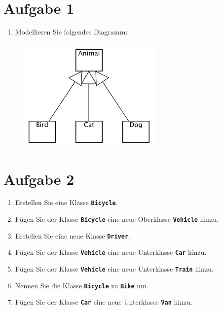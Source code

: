 \documentclass[12pt]{article}
\begin{document}
\section*{Aufgabe 1}

\begin{enumerate}
    \item Modellieren Sie folgendes Diagramm:
\end{enumerate}

\begin{figure}[hbt]
    \includegraphics[scale=1]{resources/exercise-1}
\end{figure}

\newpage

\section*{Aufgabe 2}

\begin{enumerate}
    \item Erstellen Sie eine Klasse \texttt{\textbf{Bicycle}}.
    \item Fügen Sie der Klasse \texttt{\textbf{Bicycle}} eine neue Oberklasse \texttt{\textbf{Vehicle}} hinzu.
    \item Erstellen Sie eine neue Klasse \texttt{\textbf{Driver}}.
    \item Fügen Sie der Klasse \texttt{\textbf{Vehicle}} eine neue Unterklasse \texttt{\textbf{Car}} hinzu.
    \item Fügen Sie der Klasse \texttt{\textbf{Vehicle}} eine neue Unterklasse \texttt{\textbf{Train}} hinzu.
    \item Nennen Sie die Klasse \texttt{\textbf{Bicycle}} zu \texttt{\textbf{Bike}} um.
    \item Fügen Sie der Klasse \texttt{\textbf{Car}} eine neue Unterklasse \texttt{\textbf{Van}} hinzu.
\end{enumerate}

\newpage
\end{document}
